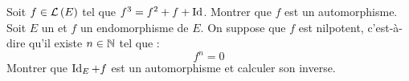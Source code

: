 \documentclass{magnolia}
\begin{document}



\begin{questions}
\question Soit $f\in\mathcal{L}\left(E\right)$ tel que $f^3=f^2+f+\operatorname{Id}$. Montrer que $f$ est un
  automorphisme.
\question Soit $E$ un \Kev et $f$ un endomorphisme de $E$. On suppose que $f$ est
  nilpotent, c'est-à-dire qu'il existe $n\in\mathbb{N}$ tel que :
  \[f^n=0\]
  Montrer que $\operatorname{Id}_E+f$ est un automorphisme et calculer son inverse.
\end{questions}




\end{document}
